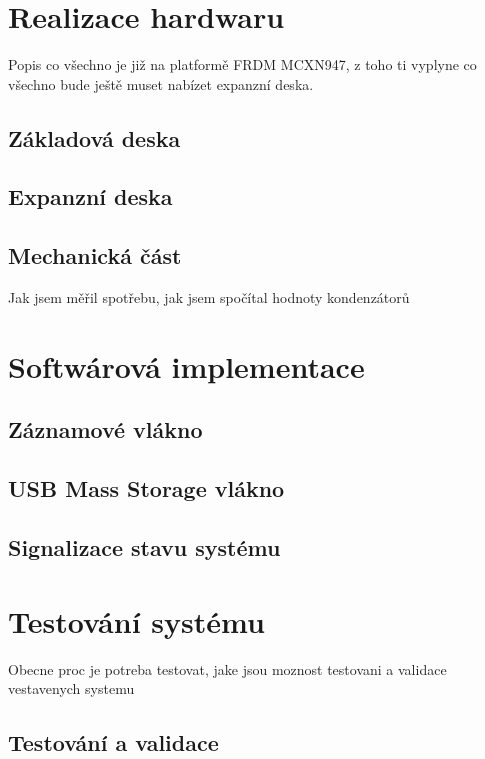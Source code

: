 
\chapter{Realizace hardwaru}
Popis co všechno je již na platformě FRDM MCXN947, z toho ti vyplyne co všechno bude ještě muset nabízet expanzní deska.
\section{Základová deska}
\section{Expanzní deska}

\section{Mechanická část}
Jak jsem měřil spotřebu, jak jsem spočítal hodnoty kondenzátorů

\chapter{Softwárová implementace}

\section{Záznamové vlákno}

\section{USB Mass Storage vlákno}

\section{Signalizace stavu systému}

\chapter{Testování systému}
Obecne proc je potreba testovat, jake jsou moznost testovani a validace vestavenych systemu


\section{Testování a validace}

